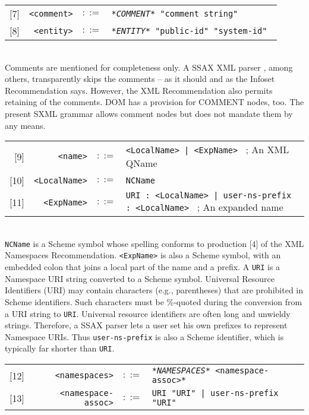 \documentclass[10pt]{article}
\begin{document}
\begin{tabular}{rrcp{2.8in}}
{[}7{]} & \texttt{<comment>} &  $::=$ & \texttt{\textit{*COMMENT*} "comment string" } \\
{[}8{]} & \texttt{<entity>} &  $::=$ & \texttt{\textit{*ENTITY*} "public-id" "system-id" } \\
\end{tabular}
\\
Comments are mentioned for completeness only. A SSAX XML parser
\cite{SSAX}, among others, transparently skips the comments --
as it should and as the Infoset Recommendation says. However, the XML
Recommendation also permits retaining of the comments. DOM has a
provision for COMMENT nodes, too. The present SXML grammar allows
comment nodes but does not mandate them by any means.

\begin{tabular}{rrcp{2.8in}}
{[}9{]} & \texttt{<name>} &  $::=$ & \texttt{<LocalName> | <ExpName> } ; An XML QName\\
{[}10{]} & \texttt{<LocalName>} &  $::=$ & \texttt{NCName } \\
{[}11{]} & \texttt{<ExpName>} &  $::=$ & \texttt{URI : <LocalName> | user-ns-prefix : <LocalName> } ; An expanded name\\
\end{tabular}
\\
\texttt{NCName} is a Scheme symbol whose spelling conforms to
production [4] of the XML Namespaces Recommendation\cite{XML Namespaces}. \texttt{<ExpName>} is also a Scheme symbol, with an embedded colon that joins a local
part of the name and a prefix. A \texttt{URI} is a
Namespace URI string converted to a Scheme symbol. Universal Resource
Identifiers (URI) may contain characters (e.g., parentheses) that are
prohibited in Scheme identifiers. Such characters must be \%-quoted
during the conversion from a URI string to \texttt{URI}. Universal resource identifiers are often long and unwieldy
strings. Therefore, a SSAX parser lets a user set his own prefixes to
represent Namespace URIs. Thus \texttt{user-ns-prefix}
is also a Scheme identifier, which is typically far shorter than 
\texttt{URI}.

\begin{tabular}{rrcp{2.8in}}
{[}12{]} & \texttt{<namespaces>} &  $::=$ & \texttt{\textit{*NAMESPACES*} <namespace-assoc>* } \\
{[}13{]} & \texttt{<namespace-assoc>} &  $::=$ & \texttt{URI "URI" | user-ns-prefix "URI" } \\
\end{tabular}
\\
\end{document}
